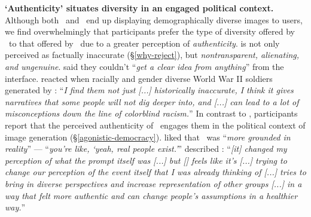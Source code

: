 \textbf{`Authenticity' situates diversity in an engaged political context.}
Although both \diverse~and \agonistic~end up displaying demographically diverse images to users, we find overwhelmingly that participants prefer the type of diversity offered by \agonistic~to that offered by \diverse~due to a greater perception of \textit{authenticity}. 
\diverse is not only perceived as factually inaccurate (\S\ref{why-reject}), but \textit{nontransparent, alienating, and ungenuine}.
 said they couldn't ``\textit{get a clear idea from anything}'' from the interface.
reacted when racially and gender diverse World War II soldiers generated by \diverse: ``\textit{I find them not just [...] historically inaccurate, I think it gives narratives that some people will not dig deeper into, and [...] can lead to a lot of misconceptions down the line of colorblind racism.}'' 
In contrast to \diverse, participants report that the perceived authenticity of \agonistic~engages them in the political context of image generation (\S\ref{agonistic-democracy}).
 liked that \agonistic~was ``\textit{more grounded in reality}'' --- ``\textit{you're like, `yeah, real people exist.'}''
 described \agonistic: ``\textit{[it] changed my perception of what the prompt itself was [...] but [\diverse] feels like it's [...] trying to change our perception of the event itself that I was already thinking of [...\agonistic] tries to bring in diverse perspectives and increase representation of other groups [...] in a way that felt more authentic and can change people's assumptions in a healthier way.}'' 

